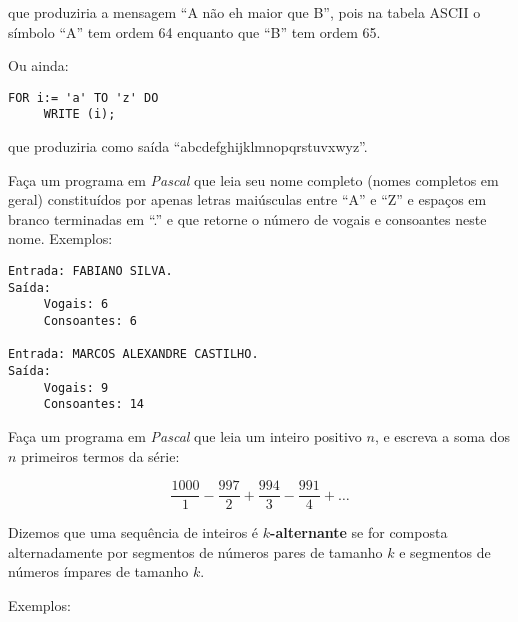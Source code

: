 \vspace*{\baselineskip}

\noindent que  produziria a mensagem ``A não eh maior que B'',
pois na tabela ASCII o símbolo ``A'' tem ordem 64 enquanto que ``B'' tem ordem 65.

Ou ainda:

\vspace*{\baselineskip}

\begin{center}
\begin{minipage}{8cm}
\begin{verbatim}
FOR i:= 'a' TO 'z' DO
     WRITE (i);
\end{verbatim}
\end{minipage}
\end{center}

\vspace*{\baselineskip}

\noindent que produziria como saída ``abcdefghijklmnopqrstuvxwyz''.

Faça um programa em \emph{Pascal} que leia seu nome completo (nomes completos em geral) constituídos
por apenas letras maiúsculas entre ``A'' e ``Z'' e espaços em branco terminadas em ``.'' e que
retorne o número de vogais e consoantes neste nome. Exemplos:

\vspace*{\baselineskip}

\begin{minipage}{8cm}
\begin{verbatim}
Entrada: FABIANO SILVA.
Saída: 
     Vogais: 6
     Consoantes: 6

Entrada: MARCOS ALEXANDRE CASTILHO.
Saída: 
     Vogais: 9
     Consoantes: 14

\end{verbatim}
\end{minipage}

\item Faça um  programa em \emph{Pascal} que leia um inteiro positivo $n$, e escreva
a soma dos $n$ primeiros termos da série:

\[ \frac{1000}{1} - \frac{997}{2} + \frac{994}{3} - \frac{991}{4} + \ldots\]

\item Dizemos que uma sequência de inteiros é {\bf $k$-alternante} se for
composta alternadamente por segmentos de números pares de tamanho $k$ e
segmentos de números ímpares de tamanho $k$.

Exemplos:

